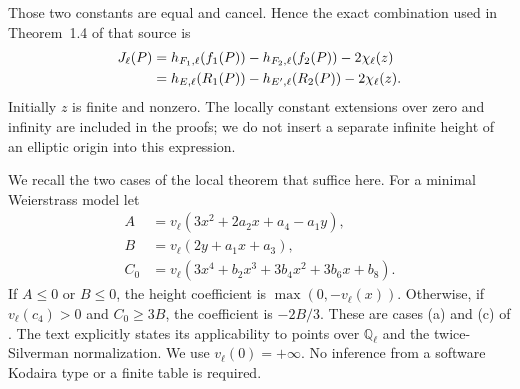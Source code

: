 Those two constants are equal and cancel. Hence the exact combination
used in Theorem~1.4 of that source is
\begin{align}
 J_\ell(P)
 &=h_{F_1,\ell}(f_1(P))-h_{F_2,\ell}(f_2(P))
                                  -2\chi_\ell(z)\notag\\
 &=h_{E,\ell}(R_1(P))-h_{E',\ell}(R_2(P))
                                  -2\chi_\ell(z).
 \label{lh-combination}
\end{align}
Initially \(z\) is finite and nonzero. The locally constant extensions
over zero and infinity are included in the proofs; we do not insert a
separate infinite height of an elliptic origin into this expression.

We recall the two cases of the local theorem that suffice here.
For a minimal Weierstrass model let
\begin{align*}
 A&=v_\ell(3x^2+2a_2x+a_4-a_1y),\\
 B&=v_\ell(2y+a_1x+a_3),\\
 C_0&=v_\ell(3x^4+b_2x^3+3b_4x^2+3b_6x+b_8).
\end{align*}
If \(A\le0\) or \(B\le0\), the height coefficient is
\(\max(0,-v_\ell(x))\). Otherwise, if \(v_\ell(c_4)>0\) and
\(C_0\ge3B\), the coefficient is \(-2B/3\).
These are cases (a) and (c) of
\cite[Proposition~3.4.1, printed pp.~72--73]{Cremona1997Algorithms}.
The text explicitly states its applicability to points over
\(\mathbb Q_\ell\) and the twice-Silverman normalization.
We use \(v_\ell(0)=+\infty\). No inference from a software Kodaira
type or a finite table is required.

